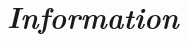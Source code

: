 \documentclass[12pt,a4paper]{article}
\begin{document}
%
%
%
%
%
%
%
%
%
%
%
%
%

\section{\itshape Information}
\end{document}
